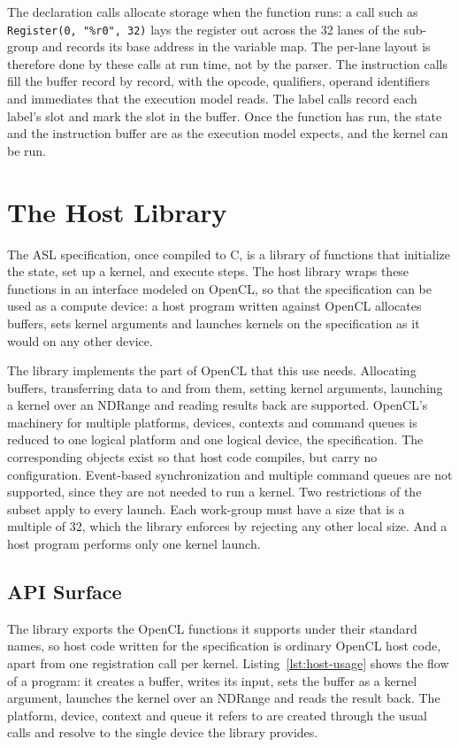 The declaration calls allocate storage when the function runs: a call such
as \texttt{Register(0, "\%r0", 32)} lays the register out across the 32
lanes of the sub-group and records its base address in the variable map.
The per-lane layout is therefore done by these calls at run time, not by
the parser. The instruction calls fill the buffer record by record, with
the opcode, qualifiers, operand identifiers and immediates that the
execution model reads. The label calls record each label's slot and mark
the slot in the buffer. Once the function has run, the state and the
instruction buffer are as the execution model expects, and the kernel can
be run.

\section{The Host Library}
\label{sec:host-library}

The ASL specification, once compiled to C, is a library of functions that
initialize the state, set up a kernel, and execute steps. The host library
wraps these functions in an interface modeled on OpenCL, so that the
specification can be used as a compute device: a host program written
against OpenCL allocates buffers, sets kernel arguments and launches
kernels on the specification as it would on any other device.

The library implements the part of OpenCL that this use needs. Allocating
buffers, transferring data to and from them, setting kernel arguments,
launching a kernel over an NDRange and reading results back are supported.
OpenCL's machinery for multiple platforms, devices, contexts and command
queues is reduced to one logical platform and one logical device, the
specification. The corresponding objects exist so that host code compiles,
but carry no configuration. Event-based synchronization and multiple
command queues are not supported, since they are not needed to run a
kernel. Two restrictions of the subset apply to every launch. Each
work-group must have a size that is a multiple of 32, which the library
enforces by rejecting any other local size. And a host program performs only
one kernel launch.

\subsection{API Surface}
\label{sec:host-api}

The library exports the OpenCL functions it supports under their standard
names, so host code written for the specification is ordinary OpenCL host
code, apart from one registration call per kernel. Listing~\ref{lst:host-usage} shows the flow of a program: it creates
a buffer, writes its input, sets the buffer as a kernel argument, launches
the kernel over an NDRange and reads the result back. The platform,
device, context and queue it refers to are created through the usual calls
and resolve to the single device the library provides.

